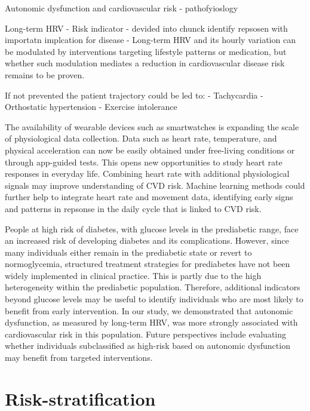 \documentclass[
  a4paper,
  headsepline=true,
  open=any]{scrbook}
\begin{document}
Autonomic dysfunction and cardiovascular risk - pathofyioslogy

Long-term HRV - Risk indicator - devided into chunck identify repsosen
with importatn implcation for disease - Long-term HRV and its hourly
variation can be modulated by interventions targeting lifestyle patterns
or medication, but whether such modulation mediates a reduction in
cardiovascular disease risk remains to be proven.

If not prevented the patient trajectory could be led to: - Tachycardia -
Orthostatic hypertension - Exercise intolerance

The availability of wearable devices such as smartwatches is expanding
the scale of physiological data collection. Data such as heart rate,
temperature, and physical acceleration can now be easily obtained under
free-living conditions or through app-guided tests. This opens new
opportunities to study heart rate responses in everyday life. Combining
heart rate with additional physiological signals may improve
understanding of CVD risk. Machine learning methods could further help
to integrate heart rate and movement data, identifying early signs and
patterns in repsonse in the daily cycle that is linked to CVD risk.

People at high risk of diabetes, with glucose levels in the prediabetic
range, face an increased risk of developing diabetes and its
complications. However, since many individuals either remain in the
prediabetic state or revert to normoglycemia, structured treatment
strategies for prediabetes have not been widely implemented in clinical
practice. This is partly due to the high heterogeneity within the
prediabetic population. Therefore, additional indicators beyond glucose
levels may be useful to identify individuals who are most likely to
benefit from early intervention. In our study, we demonstrated that
autonomic dysfunction, as measured by long-term HRV, was more strongly
associated with cardiovascular risk in this population. Future
perspectives include evaluating whether individuals subclassified as
high-risk based on autonomic dysfunction may benefit from targeted
interventions.

\hypertarget{risk-stratification-2}{%
\section{Risk-stratification}\label{risk-stratification-2}}
\end{document}
